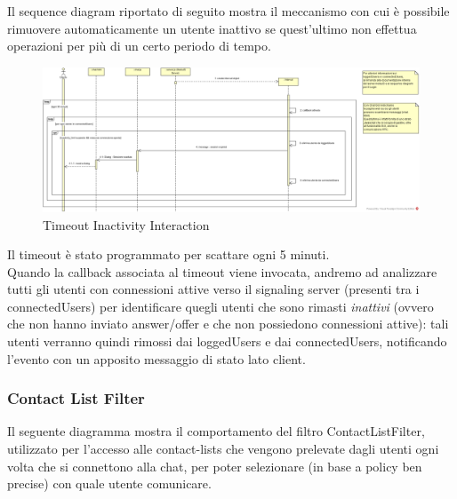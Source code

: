 Il sequence diagram riportato di seguito mostra il meccanismo con cui è possibile rimuovere automaticamente un utente inattivo se quest'ultimo non effettua operazioni per più di un certo periodo di tempo.

\begin{figure}[H]
	\centering
	\includegraphics[scale = .6]{img/sequence_timeout.png}
	\caption{Timeout Inactivity Interaction}
	\label{gfx:timeoutinteraction}
\end{figure}

Il timeout è stato programmato per scattare ogni 5 minuti.\\
Quando la callback associata al timeout viene invocata, andremo ad analizzare tutti gli utenti con connessioni attive verso il signaling server (presenti tra i connectedUsers) per identificare quegli utenti che sono rimasti \textit{inattivi} (ovvero che non hanno inviato answer/offer e che non possiedono connessioni attive): tali utenti verranno quindi rimossi dai loggedUsers e dai connectedUsers, notificando l'evento con un apposito messaggio di stato lato client.\\

\subsubsection{Contact List Filter}

Il seguente diagramma mostra il comportamento del filtro ContactListFilter, utilizzato per l'accesso alle contact-lists che vengono prelevate dagli utenti ogni volta che si connettono alla chat, per poter selezionare (in base a policy ben precise) con quale utente comunicare.

